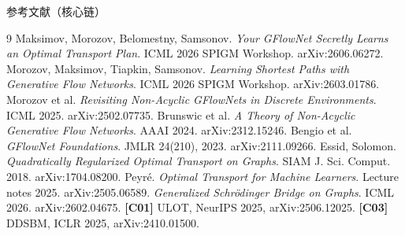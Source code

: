 \begin{frame}[shrink=15]{参考文献（核心链）}
\tiny{}
\begin{thebibliography}{9}
 Maksimov, Morozov, Belomestny, Samsonov. \emph{Your GFlowNet Secretly Learns an Optimal Transport Plan}. ICML 2026 SPIGM Workshop. arXiv:2606.06272.
 Morozov, Maksimov, Tiapkin, Samsonov. \emph{Learning Shortest Paths with Generative Flow Networks}. ICML 2026 SPIGM Workshop. arXiv:2603.01786.
 Morozov et al. \emph{Revisiting Non-Acyclic GFlowNets in Discrete Environments}. ICML 2025. arXiv:2502.07735.
 Brunswic et al. \emph{A Theory of Non-Acyclic Generative Flow Networks}. AAAI 2024. arXiv:2312.15246.
 Bengio et al. \emph{GFlowNet Foundations}. JMLR 24(210), 2023. arXiv:2111.09266.
 Essid, Solomon. \emph{Quadratically Regularized Optimal Transport on Graphs}. SIAM J. Sci. Comput. 2018. arXiv:1704.08200.
 Peyr\'e. \emph{Optimal Transport for Machine Learners}. Lecture notes 2025. arXiv:2505.06589.
 \emph{Generalized Schr\"odinger Bridge on Graphs}. ICML 2026. arXiv:2602.04675. \quad \textbf{[C01]} ULOT, NeurIPS 2025, arXiv:2506.12025. \quad \textbf{[C03]} DDSBM, ICLR 2025, arXiv:2410.01500.
\end{thebibliography}
\end{frame}
